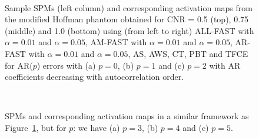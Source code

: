 \begin{figure}
  \mbox{
    }
  \mbox{
  }
    \mbox{
      }
      \caption{Sample SPMs (left column) and corresponding activation maps from the modified Hoffman
        phantom obtained for CNR = 0.5 (top), 0.75 (middle) and 1.0
        (bottom) using (from left to right) ALL-FAST
         with        $\alpha = 0.01$ and $\alpha = 0.05$,          AM-FAST with
        $\alpha = 0.01$ and $\alpha = 0.05$, AR-FAST with
        $\alpha = 0.01$ and $\alpha = 0.05$, AS, AWS, CT, PBT and TFCE
        for AR($p$) errors with (a) $p=0$, (b) $p=1$ and (c) $p=2$
        with AR coefficients decreasing with autocorrelation order.}\label{fig:ActMapDec1}
    \end{figure}
    \begin{figure}
    \mbox{
      }
    \mbox{
      }
    \mbox{      
      }
    \caption{SPMs and corresponding activation maps in a similar framework as
      Figure~\ref{fig:ActMapDec1}, but for $p$: we have (a) $p=3$, (b)
      $p=4$ and (c) $p=5$.}
      \label{fig:ActMapDec2}
    \end{figure}

